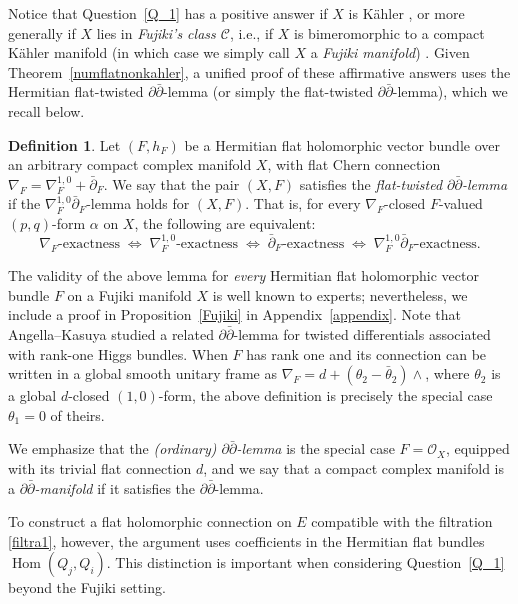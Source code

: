 \documentclass[11pt]{amsart}
\newcommand{\ddbar}{\partial\bar\partial}
\numberwithin{equation}{section}
\theoremstyle{definition}
\newtheorem{definition}  [theorem]     {Definition}
\theoremstyle{plain}
\theoremstyle{plain}
\theoremstyle{definition}
\theoremstyle{stepstyle}
\begin{document}
	
	Notice that Question~\ref{Q_1} has a positive answer if $X$ is
	K\"ahler \cite{Simpson,Deng}, or more generally if $X$ lies in
	\textit{Fujiki's class $\mathcal C$}, i.e., if $X$ is bimeromorphic
	to a compact K\"ahler manifold (in which case we simply call $X$
	a \textit{Fujiki manifold}) \cite{Biswas}.
	Given Theorem~\ref{numflatnonkahler}, a unified proof of these
	affirmative answers uses the Hermitian flat-twisted
	$\ddbar$-lemma (or simply the flat-twisted $\ddbar$-lemma),
	which we recall below.
	
	\medskip
	\begin{definition}
		Let $(F,h_F)$ be a Hermitian flat holomorphic vector bundle
		over an arbitrary compact complex manifold $X$, with flat
		Chern connection
		$\nabla_F=\nabla_F^{1,0}+\bar\partial_F$.
		We say that the pair $(X,F)$ satisfies the
		\emph{flat-twisted $\ddbar$-lemma} if the
		$\nabla_F^{1,0}\bar\partial_F$-lemma holds for $(X,F)$.
		That is, for every $\nabla_F$-closed $F$-valued $(p,q)$-form
		$\alpha$ on $X$, the following are equivalent:
		$$
		\nabla_F\text{-exactness}
		\;\Longleftrightarrow\;
		\nabla_F^{1,0}\text{-exactness}
		\;\Longleftrightarrow\;
		\bar\partial_F\text{-exactness}
		\;\Longleftrightarrow\;
		\nabla_F^{1,0}\bar\partial_F\text{-exactness}.
		$$
	\end{definition}
	
	
	
	The validity of the above lemma for \textit{every} Hermitian
	flat holomorphic vector bundle $F$ on a Fujiki manifold $X$
	is well known to experts; nevertheless, we include a proof
	in Proposition~\ref{Fujiki} in Appendix~\ref{appendix}.
	Note that Angella--Kasuya \cite{AKtwisted} studied a related
	$\ddbar$-lemma for twisted differentials associated with
	rank-one Higgs bundles.
	When $F$ has rank one and its connection can be written in
	a global smooth unitary frame as
	$\nabla_F=d+(\theta_2-\bar\theta_2)\wedge$,
	where $\theta_2$ is a global $d$-closed $(1,0)$-form,
	the above definition is precisely the special case
	$\theta_1=0$ of theirs.
	
	\medskip
	We emphasize that the \textit{(ordinary) $\ddbar$-lemma}
	is the special case $F=\mathcal O_X$, equipped with its
	trivial flat connection $d$, and we say that a compact complex
	manifold is a \textit{$\ddbar$-manifold} if it satisfies
	the $\ddbar$-lemma.
	
	
	To construct a flat holomorphic connection on $E$
	compatible with the filtration \eqref{filtra1}, however,
	the argument uses coefficients in the Hermitian flat bundles
	$\operatorname{Hom}(Q_j,Q_i)$.
	This distinction is important when considering
	Question~\ref{Q_1} beyond the Fujiki setting.
	
\end{document}
